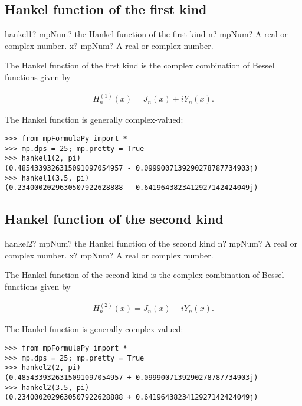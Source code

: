 \subsection{Hankel function of the first kind}

\begin{mpFunctionsExtract}
	\mpFunctionTwo
	{hankel1? mpNum? the Hankel function of the first kind}
	{n? mpNum? A real or complex number.}
	{x? mpNum? A real or complex number.}	
\end{mpFunctionsExtract}

\vpara
The Hankel function of the first kind is the complex combination of Bessel functions given by

\begin{eqnarray}
H_n^{(1)}(x) = J_n(x)+iY_n(x).
\end{eqnarray}

The Hankel function is generally complex-valued:

\begin{lstlisting}
>>> from mpFormulaPy import *
>>> mp.dps = 25; mp.pretty = True
>>> hankel1(2, pi)
(0.4854339326315091097054957 - 0.0999007139290278787734903j)
>>> hankel1(3.5, pi)
(0.2340002029630507922628888 - 0.6419643823412927142424049j)
\end{lstlisting}



\subsection{Hankel function of the second kind}

\begin{mpFunctionsExtract}
	\mpFunctionTwo
	{hankel2? mpNum? the Hankel function of the second kind}
	{n? mpNum? A real or complex number.}
	{x? mpNum? A real or complex number.}	
\end{mpFunctionsExtract}

\vpara
The Hankel function of the second kind is the complex combination of Bessel functions given by

\begin{eqnarray}
H_n^{(2)}(x) = J_n(x)-iY_n(x).
\end{eqnarray}

The Hankel function is generally complex-valued:

\begin{lstlisting}
>>> from mpFormulaPy import *
>>> mp.dps = 25; mp.pretty = True
>>> hankel2(2, pi)
(0.4854339326315091097054957 + 0.0999007139290278787734903j)
>>> hankel2(3.5, pi)
(0.2340002029630507922628888 + 0.6419643823412927142424049j)
\end{lstlisting}




